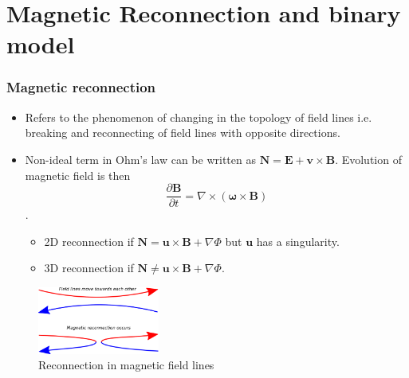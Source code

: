 \documentclass{beamer}
\begin{document}
\section{Magnetic Reconnection and binary model}
\begin{frame}
    \frametitle{Magnetic reconnection}
    \small
    \begin{itemize}
        \item Refers to the phenomenon of changing in the topology of field lines i.e. breaking and reconnecting of field lines with opposite directions.
        \item Non-ideal term in Ohm's law can be written as $\textbf{N} = \textbf{E}+\textbf{v}\times\textbf{B}.$ Evolution of magnetic field is then $$ \frac{\partial \textbf{B}}{\partial t} = \nabla\times (\mathbf{\omega}\times \textbf{B})$$.
        \begin{itemize}
            \item 2D reconnection if $\textbf{N} = \textbf{u}\times\textbf{B} + \nabla\Phi$ but $\textbf{u}$ has a singularity.
            \item 3D reconnection if $\textbf{N} \neq \textbf{u}\times\textbf{B} + \nabla\Phi$.
        \end{itemize}
    \end{itemize}
    \begin{figure}
        \centering
        \includegraphics[width=4cm]{images/reconnection.png}
        \caption{Reconnection in magnetic field lines}
        \label{fig:recon}
    \end{figure}
\end{frame}
\end{document}
